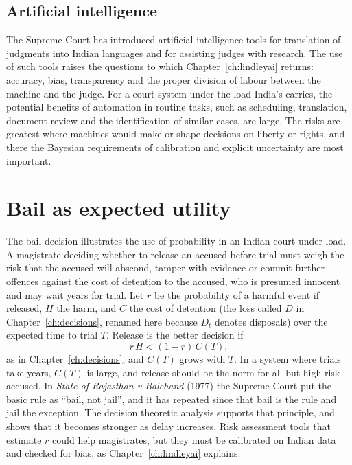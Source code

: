 \subsection{Artificial intelligence}

The Supreme Court has introduced artificial intelligence tools for translation of judgments into Indian languages and for assisting judges with research. The use of such tools raises the questions to which Chapter~\ref{ch:lindleyai} returns: accuracy, bias, transparency and the proper division of labour between the machine and the judge. For a court system under the load India's carries, the potential benefits of automation in routine tasks, such as scheduling, translation, document review and the identification of similar cases, are large. The risks are greatest where machines would make or shape decisions on liberty or rights, and there the Bayesian requirements of calibration and explicit uncertainty are most important.

\section{Bail as expected utility}

The bail decision illustrates the use of probability in an Indian court under load. A magistrate deciding whether to release an accused before trial must weigh the risk that the accused will abscond, tamper with evidence or commit further offences against the cost of detention to the accused, who is presumed innocent and may wait years for trial. Let $r$ be the probability of a harmful event if released, $H$ the harm, and $C$ the cost of detention (the loss called $D$ in Chapter~\ref{ch:decisions}, renamed here because $D_t$ denotes disposals) over the expected time to trial $T$. Release is the better decision if
\begin{equation}
r\,H < (1-r)\,C(T),
\end{equation}
as in Chapter~\ref{ch:decisions}, and $C(T)$ grows with $T$. In a system where trials take years, $C(T)$ is large, and release should be the norm for all but high risk accused. In \emph{State of Rajasthan v Balchand} (1977) the Supreme Court put the basic rule as \textquotedblleft bail, not jail\textquotedblright, and it has repeated since that bail is the rule and jail the exception. The decision theoretic analysis supports that principle, and shows that it becomes stronger as delay increases. Risk assessment tools that estimate $r$ could help magistrates, but they must be calibrated on Indian data and checked for bias, as Chapter~\ref{ch:lindleyai} explains.

